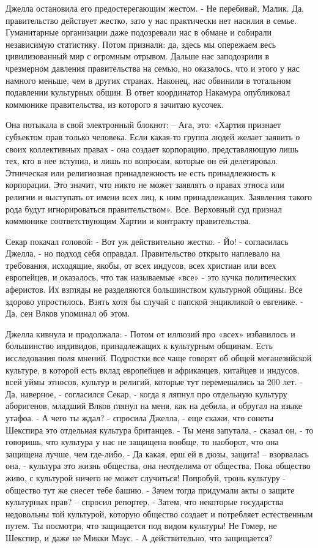 \documentclass[10pt,final]{book}
\begin{document}
Джелла остановила его предостерегающим жестом.
- Не перебивай, Малик. Да, правительство действует жестко, зато у нас практически нет насилия в семье. Гуманитарные организации даже подозревали нас в обмане и собирали независимую статистику. Потом признали: да, здесь мы опережаем весь цивилизованный мир с огромным отрывом. Дальше нас заподозрили в чрезмерном давления правительства на семью, но оказалось, что и этого у нас намного меньше, чем в других странах. Наконец, нас обвинили в тотальном подавлении культурных общин. В ответ координатор Накамура опубликовал коммюнике правительства, из которого я зачитаю кусочек.

Она потыкала в свой электронный блокнот:
-- Ага, это: «Хартия признает субъектом прав только человека. Если какая-то группа людей желает заявить о своих коллективных правах - она создает корпорацию, представляющую лишь тех, кто в нее вступил, и лишь по вопросам, которые он ей делегировал. Этническая или религиозная принадлежность не есть принадлежность к корпорации. Это значит, что никто не может заявлять о правах этноса или религии и выступать от имени всех лиц, к ним принадлежащих. Заявления такого рода будут игнорироваться правительством». Все. Верховный суд признал коммюнике соответствующим Хартии и контракту правительства.

Секар покачал головой:
- Вот уж действительно жестко.
- Йо! - согласилась Джелла, - но подход себя оправдал. Правительство открыто наплевало на требования, исходящие, якобы, от всех индусов, всех христиан или всех европейцев, и оказалось, что так называемые «все» - это кучка политических аферистов. Их взгляды не разделяются большинством культурной общины. Все здорово упростилось. Взять хотя бы случай с папской энцикликой о евгенике.
- Да, сен Влков упоминал об этом.

Джелла кивнула и продолжала:
- Потом от иллюзий про «всех» избавилось и большинство индивидов, принадлежащих к культурным общинам. Есть исследования поля мнений. Подростки все чаще говорят об общей меганезийской культуре, в которой есть вклад европейцев и африканцев, китайцев и индусов, всей уймы этносов, культур и религий, которые тут перемешались за 200 лет.
- Да, наверное, - согласился Секар, - когда я ляпнул про отдельную культуру аборигенов, младший Влков глянул на меня, как на дебила, и обругал на языке утафоа.
- А чего ты ждал? - спросила Джелла, - еще скажи, что сонеты Шекспира это отдельная культура британцев.
- Ты меня запутала, - сказал он, - то говоришь, что культура у нас не защищена вообще, то наоборот, что она защищена лучше, чем где-либо.
- Да какая, ерш ей в дюзы, защита! -- взорвалась она, - культура это жизнь общества, она неотделима от общества. Пока общество живо, с культурой ничего не может случиться! Попробуй, тронь культуру - общество тут же снесет тебе башню.
- Зачем тогда придумали акты о защите культурных прав? -- спросил репортер.
- Затем, что некоторые государства недовольны той культурой, которую общество создает и потребляет естественным путем. Ты посмотри, что защищается под видом культуры! Не Гомер, не Шекспир, и даже не Микки Маус.
- А действительно, что защищается?
\end{document}
